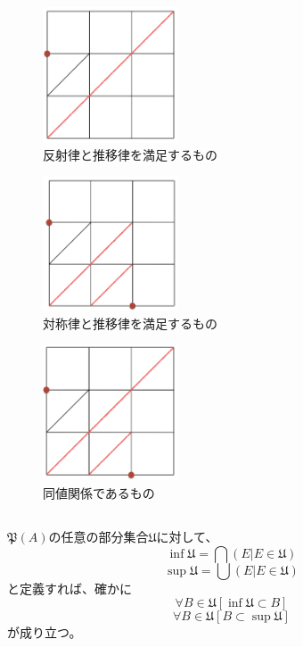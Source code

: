 \documentclass{jsarticle}
\begin{document}
\begin{figure}[htbp]
  \begin{center}
    \includegraphics[clip,width=4.0cm]{8_4/8_4_2.png}
    \caption{反射律と推移律を満足するもの}
    \label{fig:8.4.2}
  \end{center}
\end{figure}
\begin{figure}[htbp]
  \begin{center}
    \includegraphics[clip,width=4.0cm]{8_4/8_4_3.png}
    \caption{対称律と推移律を満足するもの}
    \label{fig:8.4.3}
  \end{center}
\end{figure}\begin{figure}[htbp]
  \begin{center}
    \includegraphics[clip,width=4.0cm]{8_4/8_4_4.png}
    \caption{同値関係であるもの}
    \label{fig:8.4.4}
  \end{center}
\end{figure}

\newpage

\subsection{}
$\mathfrak{P}(A)$の任意の部分集合$\mathfrak{U}$に対して、
\[\inf \mathfrak{U}=\bigcap(E|E\in\mathfrak{U})\]
\[\sup \mathfrak{U}=\bigcup(E|E\in\mathfrak{U})\]
と定義すれば、確かに
\[\forall B\in \mathfrak{U}[\inf \mathfrak{U}\subset B]\]
\[\forall B\in \mathfrak{U}[B\subset \sup \mathfrak{U}]\]
が成り立つ。
\end{document}
